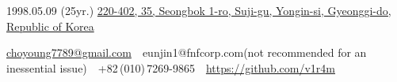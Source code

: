\documentclass[letterpaper,MMMyyyy,nonstopmode]{simpleresumecv}
\newcommand{\CVAuthor}{Eunjin Ko}
\begin{document}

\Title{\CVAuthor}

\begin{SubTitle}
{1998.05.09 (25yr.)}
\href{https://www.google.com/maps/place/35+Seongbok+1-ro,+Suji-gu,+Yongin-si,+Gyeonggi-do/data=!4m2!3m1!1s0x357b5bb08061ed73:0x32a6bf510449527d?sa=X\&ved=2ahUKEwjW6Z-k95-DAxXuslYBHWifBGUQ8gF6BAgKEAA}
{220-402, 35, Seongbok 1-ro, Suji-gu, Yongin-si, Gyeonggi-do, Republic of Korea}
\par
\href{mailto:choyoung7789@gmail.com}
{choyoung7789@gmail.com}
\,\SubBulletSymbol\,
{eunjin1@fnfcorp.com(not recommended for an inessential issue)}
\,\SubBulletSymbol\,
+82\,(010)\,7269-9865
\,\SubBulletSymbol\,
\href{https://github.com/v1r4m}
{\url{https://github.com/v1r4m}}
\end{SubTitle}
\end{document}
